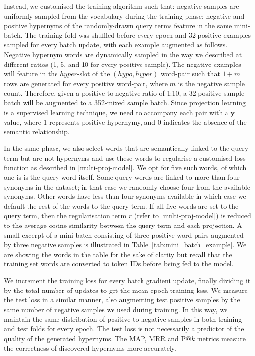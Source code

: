 Instead, we customised the training algorithm such that: negative samples are uniformly sampled from the vocabulary during the training phase; negative and positive hypernyms of the randomly-drawn query terms feature in the same mini-batch.  The training fold was shuffled before every epoch and 32 positive examples sampled for every batch update, with each example augmented as follows.  Negative hypernym words are dynamically sampled in the way we described at different ratios (1, 5, and 10 for every positive sample).  The negative examples will feature in the $hyper$-slot of the $(hypo,hyper)$ word-pair such that $1+m$ rows are generated for every positive word-pair, where $m$ is the negative sample count.  Therefore, given a positive-to-negative ratio of 1:10, a 32-positive-sample batch will be augmented to a 352-mixed sample batch.  Since projection learning is a supervised learning technique, we need to accompany each pair with a $\bm{y}$ value, where 1 represents positive hypernymy, and 0 indicates the absence of the semantic relationship.

In the same phase, we also select words that are semantically linked to the query term but are not hypernyms and use these words to regularise a customised loss function as described in \cref{multi-proj-model}.  We opt for five such words, of which one is is the query word itself.  Some query words are linked to more than four synonyms in the dataset; in that case we randomly choose four from the available synonyms.  Other words have less than four synonyms available in which case we default the rest of the words to the query term.  If all five words are set to the query term, then the regularisation term $r$ (refer to \cref{multi-proj-model}) is reduced to the average cosine similarity between the query term and each projection.  A small excerpt of a mini-batch consisting of three positive word-pairs augmented by three negative samples is illustrated in Table~\ref{tab:mini_batch_example}.  We are showing the words in the table for the sake of clarity but recall that the training set words are converted to token IDs before being fed to the model.

We increment the training loss for every batch gradient update, finally dividing it by the total number of updates to get the mean epoch training loss.  We measure the test loss in a similar manner, also augmenting test positive samples by the same number of negative samples we used during training.  In this way, we maintain the same distribution of positive to negative samples in both training and test folds for every epoch.  The test loss is not necessarily a predictor of the quality of the generated hypernyms.  The MAP, MRR and P$@k$ metrics measure the correctness of discovered hypernyms more accurately.  

